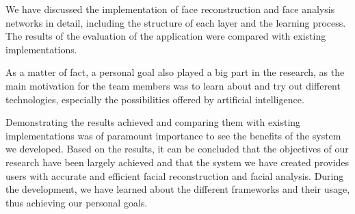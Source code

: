 \documentclass[12pt,a4]{article}
\begin{document}
        We have discussed the implementation of face reconstruction and face analysis networks in detail, 
        including the structure of each layer and the learning process. The results of the evaluation of the application were compared with existing implementations.

        As a matter of fact, a personal goal also played a big part in the research, as the main motivation for the team members was to learn about and try out different technologies, especially the possibilities offered by artificial intelligence.

        Demonstrating the results achieved and comparing them with existing implementations was of paramount importance to see the benefits of the system we developed. Based on the results, it can be concluded that the objectives of our research have been largely achieved and that the system we have created provides users with accurate and efficient facial reconstruction and facial analysis. During the development, we have learned about the different frameworks and their usage, thus achieving our personal goals.
        
    \newpage
\end{document}
